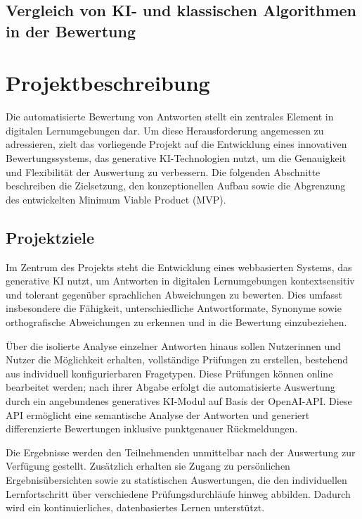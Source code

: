 \documentclass[a4paper,12pt]{article}
\begin{document}
\subsection{Vergleich von KI- und klassischen Algorithmen in der Bewertung}

\newpage

\section{Projektbeschreibung}
Die automatisierte Bewertung von Antworten stellt ein zentrales Element in digitalen Lernumgebungen dar. Um diese Herausforderung angemessen zu adressieren, zielt das vorliegende Projekt auf die Entwicklung eines innovativen Bewertungssystems, das generative KI-Technologien nutzt, um die Genauigkeit und Flexibilität der Auswertung zu verbessern. Die folgenden Abschnitte beschreiben die Zielsetzung, den konzeptionellen Aufbau sowie die Abgrenzung des entwickelten Minimum Viable Product (MVP).

\subsection{Projektziele}
Im Zentrum des Projekts steht die Entwicklung eines webbasierten Systems, das generative KI nutzt, um Antworten in digitalen Lernumgebungen kontextsensitiv und tolerant gegenüber sprachlichen Abweichungen zu bewerten. Dies umfasst insbesondere die Fähigkeit, unterschiedliche Antwortformate, Synonyme sowie orthografische Abweichungen zu erkennen und in die Bewertung einzubeziehen.

Über die isolierte Analyse einzelner Antworten hinaus sollen Nutzerinnen und Nutzer die Möglichkeit erhalten, vollständige Prüfungen zu erstellen, bestehend aus individuell konfigurierbaren Fragetypen. Diese Prüfungen können online bearbeitet werden; nach ihrer Abgabe erfolgt die automatisierte Auswertung durch ein angebundenes generatives KI-Modul auf Basis der OpenAI-API. Diese API ermöglicht eine semantische Analyse der Antworten und generiert differenzierte Bewertungen inklusive punktgenauer Rückmeldungen.

Die Ergebnisse werden den Teilnehmenden unmittelbar nach der Auswertung zur Verfügung gestellt. Zusätzlich erhalten sie Zugang zu persönlichen Ergebnisübersichten sowie zu statistischen Auswertungen, die den individuellen Lernfortschritt über verschiedene Prüfungsdurchläufe hinweg abbilden. Dadurch wird ein kontinuierliches, datenbasiertes Lernen unterstützt.
\end{document}
